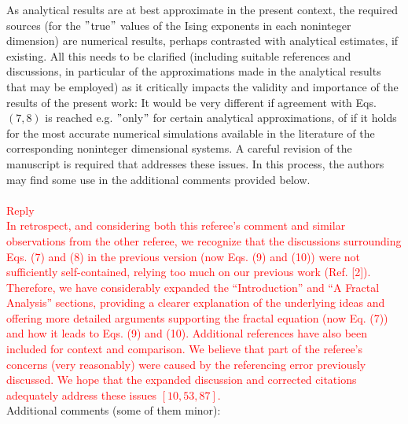 \documentclass[prd,aps,nofootinbib]{revtex4}
\begin{document}
As analytical results are at best approximate in the
present context, the required sources (for the $"$true$"$  values of the
Ising exponents in each noninteger dimension) are numerical results,
perhaps contrasted with analytical estimates, if existing. All this
needs to be clarified (including suitable references and discussions,
in particular of the approximations made in the analytical results
that may be employed) as it critically impacts the validity and
importance of the results of the present work: It would be very
different if agreement with Eqs. $(7,8)$ is reached e.g. $"$only$"$ for
certain analytical approximations, of if it holds for the most
accurate numerical simulations available in the literature of the
corresponding noninteger dimensional systems. A careful revision of
the manuscript is required that addresses these issues. In this
process, the authors may find some use in the additional comments
provided below.\\
\\
\textcolor{red}{Reply}\\
\textcolor{red}{In retrospect, and considering both this referee's comment and similar observations from the other referee, we recognize that the discussions surrounding Eqs. (7) and (8) in the previous version (now Eqs. (9) and (10)) were not sufficiently self-contained, relying too much on our previous work (Ref. [2]). Therefore, we have considerably expanded the ``Introduction'' and ``A Fractal Analysis'' sections, providing a clearer explanation of the underlying ideas and offering more detailed arguments supporting the fractal equation (now Eq. (7)) and how it leads to Eqs. (9) and (10). Additional references have also been included for context and comparison. We believe that part of the referee's concerns (very reasonably) were caused by the referencing error previously discussed. We hope that the expanded discussion and corrected citations adequately address these issues $[10, 53, 87]$.} %
\\


Additional comments (some of them minor):
\end{document}
